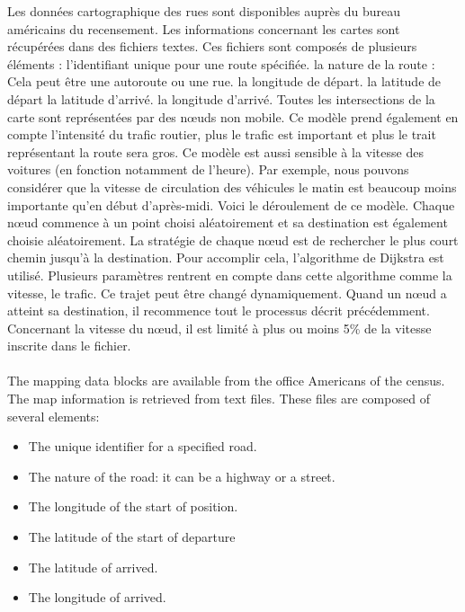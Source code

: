 Les données cartographique des rues sont disponibles auprès du bureau américains du recensement. Les informations concernant les cartes sont récupérées dans des fichiers textes. Ces fichiers sont composés de plusieurs éléments :
l'identifiant unique pour une route spécifiée.
la nature de la route : Cela peut être une autoroute ou une rue.
la longitude de départ.
la latitude de départ
la latitude d'arrivé.
la longitude d'arrivé.
Toutes les intersections de la carte sont représentées par des nœuds non mobile.
Ce modèle prend également en compte l'intensité du trafic routier, plus le trafic est important et plus le trait représentant la route sera gros. Ce modèle est aussi sensible à la vitesse des voitures (en fonction notamment de l'heure). Par exemple, nous pouvons considérer que la vitesse de circulation des véhicules le matin est beaucoup moins importante qu'en début d'après-midi.
Voici le déroulement de ce modèle. Chaque nœud commence à un point choisi aléatoirement et sa destination est également choisie aléatoirement. La stratégie de chaque nœud est de rechercher le plus court chemin jusqu'à la destination. Pour accomplir cela, l'algorithme de Dijkstra est utilisé. Plusieurs paramètres rentrent en compte dans cette algorithme comme la vitesse, le trafic. Ce trajet peut être changé dynamiquement. Quand un nœud a atteint sa destination, il recommence tout le processus décrit précédemment. Concernant la vitesse du nœud, il est limité à plus ou moins 5\% de la vitesse inscrite dans le fichier.\\\\


The mapping data blocks are available from the office Americans of the census. The map information is retrieved from text files. These files are composed of several elements:
\begin{itemize}
\item The unique identifier for a specified road.
\item The nature of the road: it can be a highway or a street.
\item The longitude of the start of position.
\item The latitude of the start of departure
\item The latitude of arrived.
\item The longitude of arrived.
\end{itemize}


